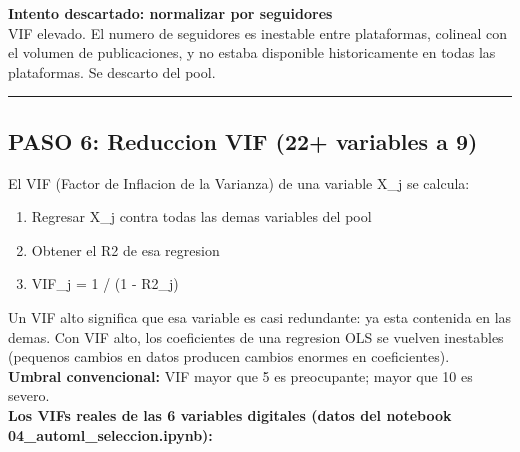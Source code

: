 \documentclass[11pt,a4paper]{article}
\begin{document}
{\textbf{Intento descartado: normalizar por seguidores}\\[2pt]
VIF elevado. El numero de seguidores es inestable entre plataformas, colineal con el volumen de publicaciones, y no estaba disponible historicamente en todas las plataformas. Se descarto del pool.\\[2pt]

\vspace{4pt}\noindent\rule{\linewidth}{0.4pt}\vspace{4pt}

\subsection{PASO 6: Reduccion VIF (22+ variables a 9)}

El VIF (Factor de Inflacion de la Varianza) de una variable X_j se calcula:\\[2pt]

\begin{enumerate}[noitemsep,topsep=2pt]
\item Regresar X_j contra todas las demas variables del pool
\item Obtener el R2 de esa regresion
\item VIF_j = 1 / (1 - R2_j)
\end{enumerate}

Un VIF alto significa que esa variable es casi redundante: ya esta contenida en las demas. Con VIF alto, los coeficientes de una regresion OLS se vuelven inestables (pequenos cambios en datos producen cambios enormes en coeficientes).\\[2pt]

\textbf{Umbral convencional:} VIF mayor que 5 es preocupante; mayor que 10 es severo.\\[2pt]

\textbf{Los VIFs reales de las 6 variables digitales (datos del notebook 04_automl_seleccion.ipynb):}\\[2pt]

}
\end{document}
